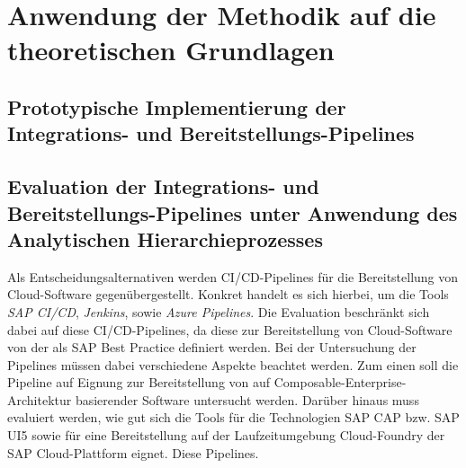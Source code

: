 \section{Anwendung der Methodik auf die theoretischen Grundlagen}

\subsection{Prototypische Implementierung der Integrations- und Bereitstellungs-Pipelines}
\subsection{Evaluation der Integrations- und Bereitstellungs-Pipelines unter Anwendung des Analytischen Hierarchieprozesses}
Als Entscheidungsalternativen werden CI/CD-Pipelines für die Bereitstellung von Cloud-Software gegenübergestellt. Konkret handelt es sich hierbei, um die Tools \textit{SAP CI/CD}, \textit{Jenkins}, sowie \textit{Azure Pipelines}. Die Evaluation beschränkt sich dabei auf diese CI/CD-Pipelines, da diese zur Bereitstellung von Cloud-Software von der als SAP Best Practice definiert werden. Bei der Untersuchung der Pipelines müssen dabei verschiedene Aspekte beachtet werden. Zum einen soll die Pipeline auf Eignung zur Bereitstellung von auf Composable-Enterprise-Architektur basierender Software untersucht werden. Darüber hinaus muss evaluiert werden, wie gut sich die Tools für die Technologien SAP CAP bzw. SAP UI5 sowie für eine Bereitstellung auf der Laufzeitumgebung Cloud-Foundry der SAP Cloud-Plattform eignet. Diese Pipelines.
